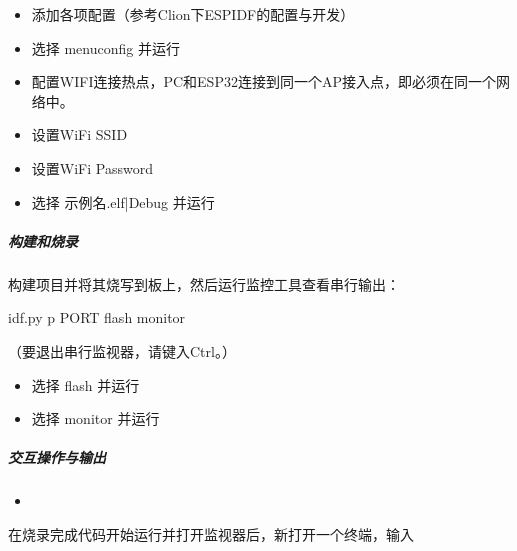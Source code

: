 \documentclass[a4paper,12pt,english]{sphinxmanual}
\begin{document}
{{\begin{itemize}
\item {} 
\sphinxAtStartPar
添加各项配置（参考Clion下ESP\sphinxhyphen{}IDF的配置与开发）

\item {} 
\sphinxAtStartPar
选择 menuconfig 并运行

\item {} 
\sphinxAtStartPar
配置WIFI连接热点，PC和ESP32连接到同一个AP接入点，即必须在同一个网络中。

\item {} 
\sphinxAtStartPar
设置WiFi SSID

\item {} 
\sphinxAtStartPar
设置WiFi Password

\item {} 
\sphinxAtStartPar
选择 示例名.elf|Debug  并运行

\end{itemize}


\subparagraph{构建和烧录}
\label{\detokenize{exp-esp32/socket/tcp:id4}}
\sphinxAtStartPar
构建项目并将其烧写到板上，然后运行监控工具查看串行输出：

\sphinxAtStartPar
{}

\begin{sphinxVerbatim}[commandchars=\\\{\}]
idf.py \PYGZhy{}p PORT flash monitor
\end{sphinxVerbatim}

\sphinxAtStartPar
（要退出串行监视器，请键入Ctrl\sphinxhyphen{}{]}。）

\sphinxAtStartPar
{}
\begin{itemize}
\item {} 
\sphinxAtStartPar
选择 flash 并运行

\item {} 
\sphinxAtStartPar
选择 monitor 并运行

\end{itemize}


\subparagraph{交互操作与输出}
\label{\detokenize{exp-esp32/socket/tcp:id5}}\begin{itemize}
\item {} 
\sphinxAtStartPar
{}

\end{itemize}

\sphinxAtStartPar
在烧录完成代码开始运行并打开监视器后，新打开一个终端，输入

}}
\end{document}

